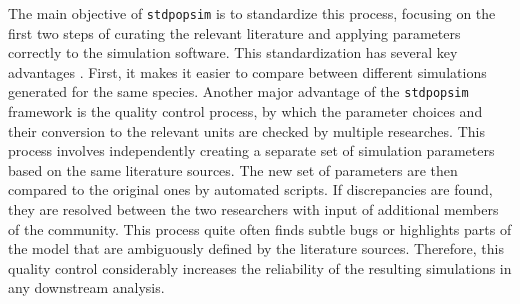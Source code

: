 \documentclass[hidelinks]{article}
\begin{document}
The main objective of \texttt{stdpopsim} is to standardize this process, focusing on the
first two steps of curating the relevant literature and applying parameters
correctly to the simulation software. This standardization has several key advantages
\citep{Adrion2020}. First, it makes it easier to compare between different
simulations generated for the same species. Another major advantage of the
\texttt{stdpopsim} framework is the quality control process, by which the parameter choices and their conversion to the relevant units are checked by multiple researches.
This process involves independently creating a separate set of simulation
parameters based on the same literature sources. The new set of parameters are then
compared to the original ones by automated scripts. If discrepancies are found, they
are resolved between the two researchers with input of additional members of
the community. This process quite often
finds subtle bugs  \citep{Ragsdale2020} or highlights parts of the model that are
ambiguously defined by the literature sources. 
Therefore, this quality control considerably increases the reliability of the
resulting simulations in any downstream analysis.

%
\end{document}
